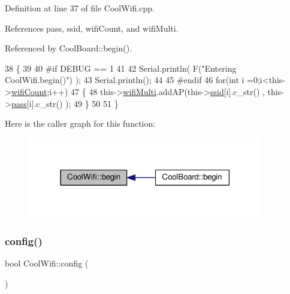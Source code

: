 Definition at line 37 of file Cool\+Wifi.\+cpp.



References pass, ssid, wifi\+Count, and wifi\+Multi.



Referenced by Cool\+Board\+::begin().


\begin{DoxyCode}
38 \{ 
39 
40 \textcolor{preprocessor}{#if DEBUG == 1 }
41 
42     Serial.println( F(\textcolor{stringliteral}{"Entering CoolWifi.begin()"}) );
43     Serial.println();
44 
45 \textcolor{preprocessor}{#endif}
46     \textcolor{keywordflow}{for}(\textcolor{keywordtype}{int} i =0;i<this->\hyperlink{classCoolWifi_ab133bd92fcb895b884deecd6678592e4}{wifiCount};i++)
47     \{
48          this->\hyperlink{classCoolWifi_a7862a8c0d7239877e2956c14a368aab8}{wifiMulti}.addAP(this->\hyperlink{classCoolWifi_a893b21d0fed821438733bba2e73fb4c2}{ssid}[i].c\_str() , this->\hyperlink{classCoolWifi_a0c3332a149245aaad060b32593a54c9b}{pass}[i].c\_str() );    
49     \}
50     
51 \}
\end{DoxyCode}
Here is the caller graph for this function\+:
\nopagebreak
\begin{figure}[H]
\begin{center}
\leavevmode
\includegraphics[width=291pt]{classCoolWifi_a46942fed90e475112cc10b78a32e7aaa_icgraph}
\end{center}
\end{figure}
\mbox{\label{classCoolWifi_a4eb2f6b9b09dd588964b88b6c70122c0}} 
\subsubsection{\texorpdfstring{config()}{config()}\hspace{0.1cm}{\footnotesize\ttfamily [1/2]}}
{\footnotesize\ttfamily bool Cool\+Wifi\+::config (\begin{DoxyParamCaption}{ }\end{DoxyParamCaption})}

